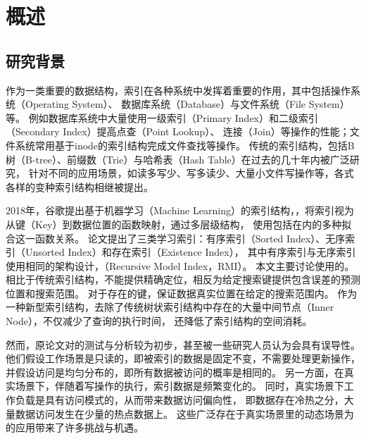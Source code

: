 
\chapter{概述}
\label{chap:intro}

\section{研究背景}

作为一类重要的数据结构，索引在各种系统中发挥着重要的作用，其中包括操作系统（Operating System）、
数据库系统（Database）与文件系统（File System）等。
例如数据库系统中大量使用一级索引（Primary Index）和二级索引（Secondary Index）提高点查（Point Lookup）、
连接（Join）等操作的性能；文件系统常用基于inode的索引结构完成文件查找等操作。
传统的索引结构，包括B树（B-tree）、前缀数（Trie）与哈希表（Hash Table）在过去的几〸年内被广泛研究，
针对不同的应用场景，如读多写少、写多读少、大量小文件写操作等，各式各样的变种索引结构相继被提出\cite{zhang2016reducing, esmet2012tokufs, bender2015and, mao2012cache, wu2019wormhole, fittingtree, morrison1968patricia, boehm2011efficient, leis2013adaptive}。

2018年，谷歌提出基于机器学习（Machine Learning）的索引结构，{\li}\cite{kraska2018case}，将索引视为从键（Key）到数据位置的函数映射，通过多层级{\model}结构，
使用包括{\nn}在内的多种{\model}拟合这一函数关系。
论文提出了三类学习索引：有序索引（Sorted Index）、无序索引（Unsorted Index）和存在索引（Existence Index），
其中有序索引与无序索引使用相同的架构设计，{\rmi}（Recursive Model Index，RMI）。
本文主要讨论使用{\rmi}的{\li}。
相比于传统索引结构，{\li}不能提供精确定位，相反{\li}为给定搜索键提供包含误差的预测位置和搜索范围。
对于存在的键，{\li}保证数据真实位置在给定的搜索范围内。
作为一种新型索引结构，{\li}去除了传统树状索引结构中存在的大量中间节点（Inner Node），不仅减少了查询的执行时间，
还降低了索引结构的空间消耗。

然而，原论文\cite{kraska2018case}对{\li}的测试与分析较为初步，甚至被一些研究人员认为会具有误导性\cite{throwalgo}。
他们假设工作场景是只读的，即被索引的数据是固定不变，{\li}不需要处理更新操作，并假设访问是均匀分布的，即所有数据被访问的概率是相同的。
另一方面，在真实场景下，伴随着写操作的执行，索引数据是频繁变化的\cite{tpcc}。
同时，真实场景下工作负载是具有访问模式的，从而带来数据访问偏向性\cite{zhang2016reducing, debrabant2013anti, eldawy2014trekking, levandoski2013identifying}，
即数据存在冷热之分，大量数据访问发生在少量的热点数据上。
这些广泛存在于真实场景里的动态场景为{\li}的应用带来了许多挑战与机遇。

